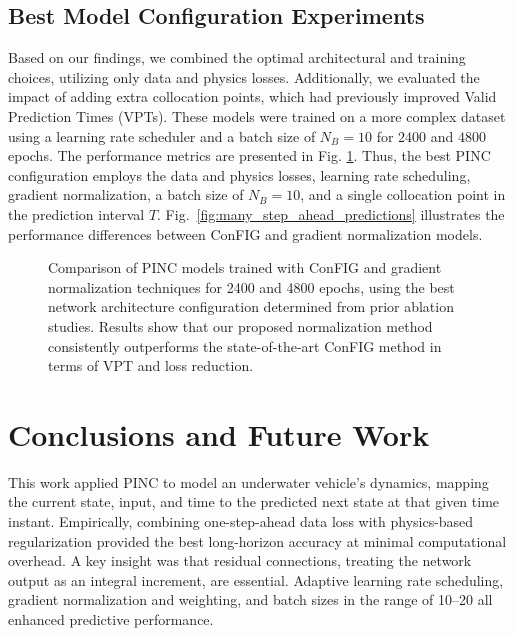 \subsection{Best Model Configuration Experiments}
\label{subsec:best_confs}
%
Based on our findings, we combined the optimal architectural and training choices, utilizing only data and physics losses. Additionally, we evaluated the impact of adding extra collocation points, which had previously improved Valid Prediction Times (VPTs).
These models were trained on a more complex dataset using a learning rate scheduler and a batch size of $N_B=10$ for $2400$ and $4800$ epochs. The performance metrics are presented in Fig. \ref{fig:final_results}. 
Thus, the best PINC configuration employs the data and physics losses, learning rate scheduling, gradient normalization, a batch size of $N_B=10$, and a single collocation point in the prediction interval $T$.
Fig.~\ref{fig:many_step_ahead_predictions} illustrates the performance differences between ConFIG and gradient normalization models.

\begin{figure}[!t]

    \caption{Comparison of PINC models trained with ConFIG and gradient normalization techniques for 2400 and 4800 epochs, using the best network architecture configuration determined from prior ablation studies. Results show that our proposed normalization method consistently outperforms the state-of-the-art ConFIG method in terms of VPT and loss reduction.}
    \label{fig:final_results}
\end{figure}






\section{Conclusions and Future Work} %
\label{sec:conclusions}
This work applied PINC to model an underwater vehicle's dynamics, mapping the current state, input, and time to the predicted next state at that given time instant. Empirically, combining one-step-ahead data loss with physics-based regularization provided the best long-horizon accuracy at minimal computational overhead. A key insight was that residual connections, treating the network output as an integral increment, are essential. Adaptive learning rate scheduling, gradient normalization and weighting, and batch sizes in the range of 10–20 all enhanced predictive performance.

